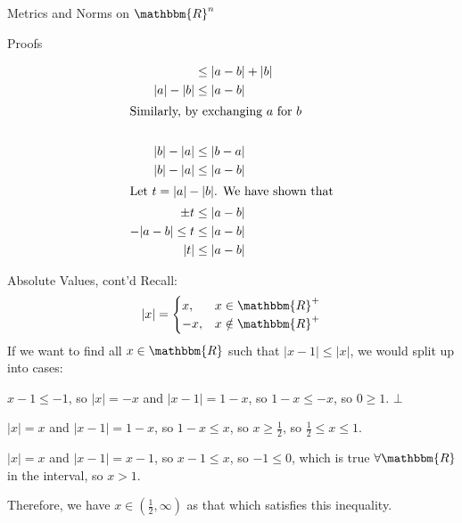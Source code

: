 \documentclass[10pt]{extarticle}
\newcommand{\R}{\mathbbm{R}}
\begin{document}
\begin{problem}{Metrics and Norms on $\R^n$}
\begin{problem}{Proofs}
\begin{description}[font=\normalfont]
\begin{align*}
                &\leq |a-b| + |b| \\
            |a| - |b| &\leq |a-b|\\
            \shortintertext{Similarly, by exchanging $a$ for $b$}\\
            |b| - |a| &\leq |b-a|\\
            |b| - |a| &\leq |a-b|\\
            \shortintertext{Let $t = |a| - |b|$. We have shown that}
            \pm t &\leq |a-b|\\
            -|a-b| \leq t &\leq |a-b|\\
            |t| &\leq |a-b|
          \end{align*}
      \end{description}
    \end{problem}
  \end{problem}
  \begin{problem}{Absolute Values, cont'd}
    Recall:
    \[
      |x| = \begin{cases}
        x,&x\in\R^+\\
        -x,&x\notin \R^+
      \end{cases}
    \] 
    If we want to find all $x\in\R$ such that $|x-1| \leq |x|$, we would split up into cases:
    \begin{description}[font=\normalfont]
      \item[$x\leq 0$] $x-1 \leq -1$, so $|x| = -x$ and $|x-1| = 1-x$, so $1-x \leq -x$, so $0 \geq 1$. $\bot$
      \item[$0 < x \leq 1$] $|x| = x$ and $|x-1| = 1-x$, so $1-x \leq x$, so $x \geq \frac{1}{2}$, so $\frac{1}{2} \leq x \leq 1$.
      \item[$1 < x$] $|x| = x$ and $|x-1| = x-1$, so $x-1 \leq x$, so $-1 \leq 0$, which is true $\forall \R$ in the interval, so $x > 1$.
    \end{description}
    Therefore, we have $x\in \left(\frac{1}{2},\infty\right)$ as that which satisfies this inequality.
  \end{problem}
\end{document}
